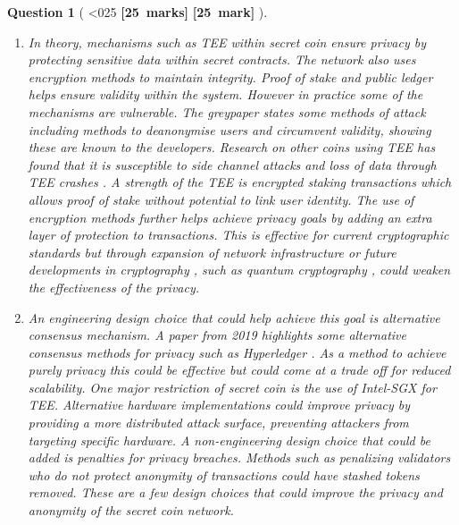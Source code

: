 \documentclass[a4paper]{article}
\theoremstyle{que}
\newtheorem{question}{Question}
\newcommand\points[1]{%
\ifnum1<0#1\relax%
    {\bf \small [#1~marks]}%
  \else%
    {\bf \small [#1~mark]}%
  \fi%
}%
\begin{document}
\begin{question}[\points{25}]
\begin{enumerate}[label=(\alph*)]
    \item[(ii)] In theory, mechanisms such as TEE within secret coin ensure privacy by protecting sensitive data within secret contracts. The network also uses encryption methods to maintain integrity. Proof of stake and public ledger helps ensure validity within the system. However in practice some of the mechanisms are vulnerable. The greypaper \cite{secret_network_graypaper} states some methods of attack including methods to deanonymise users and circumvent validity, showing these are known to the developers. Research on other coins using TEE has found that it is susceptible to side channel attacks and loss of data through TEE crashes \cite{lind2017teechain}. A strength of the TEE is encrypted staking transactions which allows proof of stake without potential to link user identity. The use of encryption methods further helps achieve privacy goals by adding an extra layer of protection to transactions. This is effective for current cryptographic standards but through expansion of network infrastructure or future developments in cryptography , such as quantum cryptography \cite{pirandola2020advances} , could weaken the effectiveness of the privacy.
    
    \item[(iii)]
    An engineering design choice that could help achieve this goal is alternative consensus mechanism. A paper from 2019 highlights some alternative consensus methods for privacy such as Hyperledger \cite{pahlajani2019survey}. As a method to achieve purely privacy this could be effective but could come at a trade off for reduced scalability. One major restriction of secret coin is the use of Intel-SGX for TEE. Alternative hardware implementations could improve privacy by providing a more distributed attack surface, preventing attackers from targeting specific hardware. A non-engineering design choice that could be added is penalties for privacy breaches. Methods such as penalizing validators who do not protect anonymity of transactions could have stashed tokens removed.
    These are a few design choices that could improve the privacy and anonymity of the secret coin network.
  \end{enumerate}
\end{question}

\newpage

\end{document}
